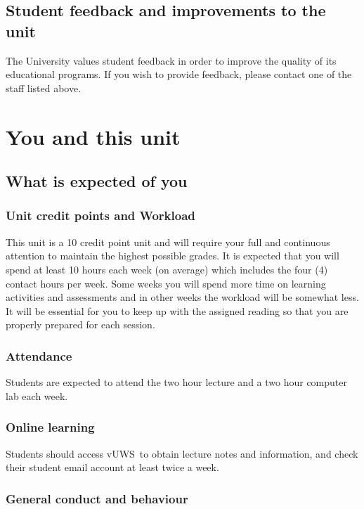 \documentclass[a4paper,oneside]{book}
\newcommand{\vuws}{vUWS}
\begin{document}
\section{Student feedback and improvements to the unit}

The University values student feedback in order to improve the quality
of its educational programs. If you wish to provide feedback, please
contact one of the staff listed above.


\chapter{You and this unit}

\section{What is expected of you}


\subsection*{Unit credit points and Workload}
This unit is a 10 credit point unit and will require your full and
continuous attention to maintain the highest possible grades.  It is
expected that you will spend at least 10 hours each week (on average)
which includes the four (4) contact hours per week.  Some weeks you
will spend more time on learning activities and assessments and in
other weeks the workload will be somewhat less.  It will be essential
for you to keep up with the assigned reading so that you are properly
prepared for each session.

\subsection*{Attendance}
Students are expected to attend the two hour lecture and a two
hour computer lab each week.

\subsection*{Online learning}
Students should access \vuws~to obtain lecture notes and information,
and check their student email account at least twice a week.

\subsection*{General conduct and behaviour}
\end{document}
